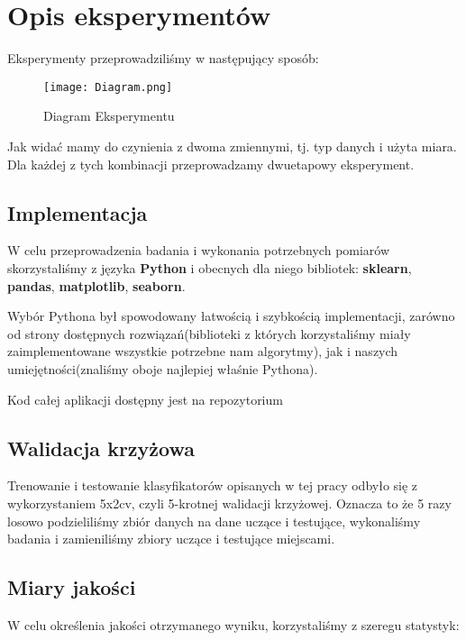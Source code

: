 \section{Opis eksperymentów}

	Eksperymenty przeprowadziliśmy w następujący sposób:
	
	\begin{figure}[h]
		\centering
		\texttt{[image: Diagram.png]}
		\captionsetup{justification=centering}
		\caption{Diagram Eksperymentu}
		\label{fig:1}
	\end{figure}

	Jak widać mamy do czynienia z dwoma zmiennymi, tj. typ danych i użyta miara. Dla każdej z tych kombinacji przeprowadzamy dwuetapowy eksperyment.
	
	\subsection{Implementacja}
	
	W celu przeprowadzenia badania i wykonania potrzebnych pomiarów skorzystaliśmy z języka \textbf{Python} i obecnych dla niego bibliotek: \textbf{sklearn}, \textbf{pandas}, \textbf{matplotlib}, \textbf{seaborn}.
	
	Wybór Pythona był spowodowany łatwością i szybkością implementacji, zarówno od strony dostępnych rozwiązań(biblioteki z których korzystaliśmy miały zaimplementowane wszystkie potrzebne nam algorytmy), jak i naszych umiejętności(znaliśmy oboje najlepiej właśnie Pythona).
	
	Kod całej aplikacji dostępny jest na repozytorium \cite{2}
	
	\subsection{Walidacja krzyżowa}
	
	Trenowanie i testowanie klasyfikatorów opisanych w tej pracy odbyło się z wykorzystaniem 5x2cv, czyli 5-krotnej walidacji krzyżowej. Oznacza to że 5 razy losowo podzieliliśmy zbiór danych na dane uczące i testujące, wykonaliśmy badania i zamieniliśmy zbiory uczące i testujące miejscami.
	
	\subsection{Miary jakości}
	
	W celu określenia jakości otrzymanego wyniku, korzystaliśmy z szeregu statystyk:
	
